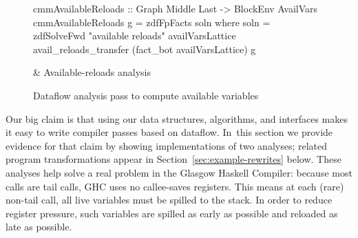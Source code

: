 \documentclass[blockstyle,preprint,nocopyrightspace]{sigplanconf}
\newcommand\secref[1]{Section~\ref{sec:#1}}
\newcommand\figlabel[1]{\label{fig:#1}}
\begin{document}
\begin{figure*}
\begin{codetable}
\T\begin{code}
cmmAvailableReloads :: Graph Middle Last -> BlockEnv AvailVars
cmmAvailableReloads g = zdfFpFacts soln
  where soln = zdfSolveFwd "available reloads" availVarsLattice 
               avail_reloads_transfer (fact_bot availVarsLattice) g
\end{code}%
\B
& Available-reloads analysis\\

\end{codetable}
\caption{Dataflow analysis pass to compute available variables}
\figlabel{avail-all}
\figlabel{avail}
\figlabel{avail-lattice}
\figlabel{avail-gen-kill}
\figlabel{avail-transfers}
\figlabel{avail-running}
\end{figure*}

% 
% 
% 
% 


Our big claim is that using our data structures, algorithms, and
interfaces makes it easy to write compiler passes based on dataflow.
In~this section we provide evidence for that claim by showing
implementations of two analyses;
related program transformations appear in \secref{example-rewrites}
below. 
These analyses help solve a real problem in the Glasgow Haskell
Compiler:
because most calls are tail calls, GHC uses no 
callee-saves registers.
This means at each (rare) non-tail call, all live
variables must be spilled to the stack.
In order to reduce register pressure,
such variables are spilled as early as possible and reloaded as late as possible.
\end{document}
